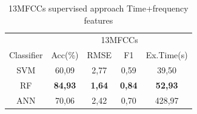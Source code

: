 \documentclass[conference]{IEEEtran}
\begin{document}
\begin{table}[!ht]
    \centering
    \caption{13MFCCs supervised approach Time+frequency features}
    \label{tab:13MFCCs Time+Frequency Features Table Results}
    \begin{tabular}{c c c c c}
    \toprule
    &\multicolumn{4}{c}{13MFCCs}\\
    \cmidrule{2-5}
        Classifier  &Acc(\%) &RMSE &F1 &Ex.Time(s)\\
    \midrule 
        SVM             &60,09 &2,77 &0,59 &39,50\\
        RF              &\textbf{84,93}&\textbf{1,64}&\textbf{0,84}&\textbf{52,93}\\
        ANN             &70,06 &2,42 &0,70 &428,97\\
    \bottomrule
    \end{tabular}
\end{table}
\end{document}
